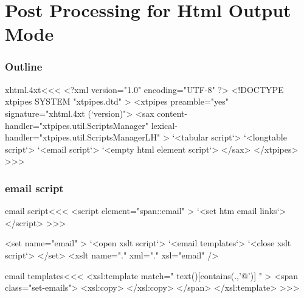 \documentclass{article}
\begin{document}

\newcount\tmpcnt  \tmpcnt\time  \divide{}
\edef\temp{\the\tmpcnt}
\multiply{} \advance\tmpcnt  \time

\edef\version{\the\year-\ifnum \month<10 0\fi
  \the\month-\ifnum \day<10 0\fi\the\day
   -\ifnum \temp<10 0\fi \temp
   :\ifnum \tmpcnt<10 0\fi\the\tmpcnt}

\def\CopyYear.#1.{%
   \ifnum #1=\year #1\space\space\space\space\space\space
    \else          #1--\the\year\fi
}






\part{Post Processing for Html Output Mode}


\section{Outline}



\<xhtml.4xt\><<<
<?xml version="1.0" encoding="UTF-8" ?>
<!DOCTYPE xtpipes SYSTEM "xtpipes.dtd" >
<xtpipes preamble="yes" signature="xhtml.4xt (`version)">
   <sax content-handler="xtpipes.util.ScriptsManager" 
        lexical-handler="xtpipes.util.ScriptsManagerLH" >
     `<tabular script`>
     `<longtable script`>
     `<email script`>
     `<empty html element script`>
   </sax>
</xtpipes>
>>>


\section{email script}

\<email script\><<<
<script element="span::email" >
   `<set htm email links`>
</script> 
>>>

   <set name="email" >
      `<open xslt script`>
      `<email templates`>
      `<close xslt script`>
   </set>
   <xslt name="." xml="." xsl="email" />


\<email templates\><<<
<xsl:template match=" text()[contains(.,'@')] " >
<span class="set-emails">
      <xsl:copy>
      </xsl:copy> 
</span>     
</xsl:template> 
>>>
\end{document}
